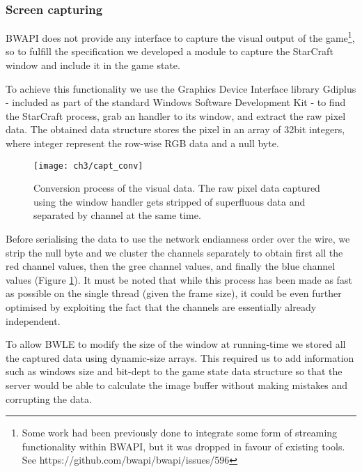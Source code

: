 
\subsubsection{Screen capturing}


BWAPI does not provide any interface to capture the visual output of the
game\footnote{Some work had been previously done to integrate some form of
  streaming functionality within BWAPI, but it was dropped in favour of existing
  tools. See https://github.com/bwapi/bwapi/issues/596}, so to fulfill the
specification we developed a module to capture the StarCraft window and include
it in the game state.

To achieve this functionality we use the Graphics Device Interface library
Gdiplus - included as part of the standard Windows Software Development Kit - to
find the StarCraft process, grab an handler to its window, and extract the raw
pixel data. The obtained data structure stores the pixel in an array of 32bit
integers, where integer represent the row-wise RGB data and a null byte.

\begin{figure}[h]
    \centering
    \texttt{[image: ch3/capt\_conv]}
    \caption{Conversion process of the visual data. The raw pixel data captured
      using the window handler gets stripped of superfluous data and separated
      by channel at the same time.}
    \label{fig:capt_conv}
\end{figure}

Before serialising the data to use the network endianness order over the wire,
we strip the null byte and we cluster the channels separately to obtain first
all the red channel values, then the gree channel values, and finally the blue
channel values (Figure \ref{fig:capt_conv}). It must be noted that while this
process has been made as fast as possible on the single thread (given the frame
size), it could be even further optimised by exploiting the fact that the
channels are essentially already independent. 

To allow BWLE to modify the size of the window at running-time we stored all the
captured data using dynamic-size arrays. This required us to add information
such as windows size and bit-dept to the game state data structure so that the
server would be able to calculate the image buffer without making mistakes and
corrupting the data.

